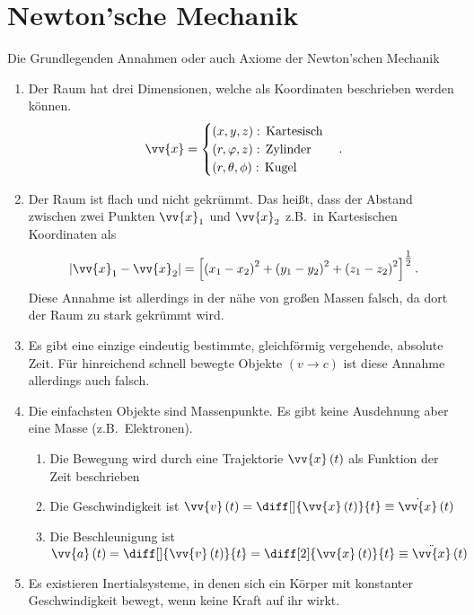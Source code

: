\documentclass[a4paper,12pt]{article}
\numberwithin{equation}{section}
\begin{document}
\section{Newton'sche Mechanik}
Die Grundlegenden Annahmen oder auch Axiome der Newton'schen Mechanik
\begin{enumerate}[label=\arabic*)]
        \item Der Raum hat drei Dimensionen, welche als Koordinaten beschrieben werden können.
                \[ 
                        \vv{x}=\begin{cases}
                                \left(x,y,z\right):\,\text{Kartesisch}\\
                                \left(r,\varphi ,z\right):\,\text{Zylinder}\\
                                \left(r,\theta,\phi \right):\,\text{Kugel}
                        \end{cases}
                .\] 
        \item Der Raum ist flach und nicht gekrümmt. Das heißt, dass der Abstand zwischen zwei Punkten $\vv{x}_1$ und $\vv{x}_2$ z.B.\, in Kartesischen Koordinaten als 
                \[ 
                        |\vv{x}_1-\vv{x}_2|=\left[\left(x_1-x_2\right)^2+\left(y_1-y_2\right)^2+\left(z_1-z_2\right)^2\right]^{\tfrac{1}{2}}
                .\] 
                Diese Annahme ist allerdings in der nähe von großen Massen falsch, da dort der Raum zu stark gekrümmt wird.
        \item Es gibt eine einzige eindeutig bestimmte, gleichförmig vergehende, absolute Zeit. Für hinreichend schnell bewegte Objekte $\left(v\rightarrow c\right)$ ist diese Annahme allerdings auch falsch.
        \item Die einfachsten Objekte sind Massenpunkte. Es gibt keine Ausdehnung aber eine Masse (z.B.\, Elektronen). 
                \begin{enumerate}[label=--]
                        \item Die Bewegung wird durch eine Trajektorie $\vv{x}\left(t\right)$ als Funktion der Zeit beschrieben
                        \item Die Geschwindigkeit ist $\vv{v}\left(t\right)=\diff[]{\vv{x}\left(t\right)}{t}\equiv\dot{\vv{x}}\left(t\right)$
                        \item Die Beschleunigung ist $\vv{a}\left(t\right)=\diff[]{\vv{v}\left(t\right)}{t}=\diff[2]{\vv{x}\left(t\right)}{t}\equiv\ddot{\vv{x}}\left(t\right)$ 
                \end{enumerate}
        \item Es existieren Inertialsysteme, in denen sich ein Körper mit konstanter Geschwindigkeit bewegt, wenn keine Kraft auf ihr wirkt.
\end{enumerate}
\end{document}
